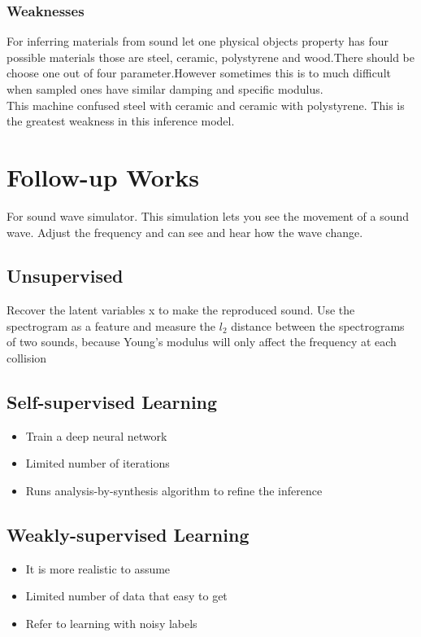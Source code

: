 \documentclass[12pt]{article}
\begin{document}
\subsubsection{Weaknesses}
For inferring materials from sound let one physical objects property has four possible materials those are steel, ceramic, polystyrene and wood.There should be choose one out of four parameter.However sometimes this is to much difficult when sampled ones have similar damping and specific modulus.\\
This machine confused steel with ceramic and ceramic with polystyrene. This is the greatest weakness in this inference model.

\section{Follow-up Works}

For sound wave simulator. This simulation lets you see the movement of a sound wave. Adjust the frequency and can see and hear how the wave change.
\newline
\newline
\subsection{Unsupervised}
Recover the latent variables x to make the reproduced sound.
Use the spectrogram as a feature and measure the
$ l_{2} $ distance between the spectrograms of two sounds, because Young’s modulus will only affect the
frequency at each collision

\subsection{Self-supervised Learning}
\begin{itemize} 
\item Train a deep neural network
\item Limited number of iterations
\item Runs analysis-by-synthesis algorithm to refine the inference
\end{itemize} 

\subsection{Weakly-supervised Learning}
\begin{itemize} 
\item It is more realistic to assume
\item Limited number of data that easy to get
\item Refer to learning with noisy labels
\end{itemize}
\end{document}
